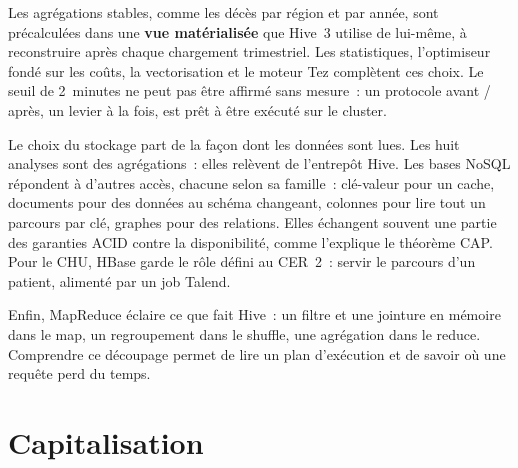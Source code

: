 \noindent Les agrégations stables, comme les décès par région et par année, sont précalculées dans une \textbf{vue matérialisée} que Hive~3 utilise de lui-même, à reconstruire après chaque chargement trimestriel. Les statistiques, l'optimiseur fondé sur les coûts, la vectorisation et le moteur Tez complètent ces choix. Le seuil de 2~minutes ne peut pas être affirmé sans mesure~: un protocole avant / après, un levier à la fois, est prêt à être exécuté sur le cluster.

\vspace{0.2cm}

\noindent Le choix du stockage part de la façon dont les données sont lues. Les huit analyses sont des agrégations~: elles relèvent de l'entrepôt Hive. Les bases NoSQL répondent à d'autres accès, chacune selon sa famille~: clé-valeur pour un cache, documents pour des données au schéma changeant, colonnes pour lire tout un parcours par clé, graphes pour des relations. Elles échangent souvent une partie des garanties ACID contre la disponibilité, comme l'explique le théorème CAP. Pour le CHU, HBase garde le rôle défini au CER~2~: servir le parcours d'un patient, alimenté par un job Talend.

\vspace{0.2cm}

\noindent Enfin, MapReduce éclaire ce que fait Hive~: un filtre et une jointure en mémoire dans le map, un regroupement dans le shuffle, une agrégation dans le reduce. Comprendre ce découpage permet de lire un plan d'exécution et de savoir où une requête perd du temps.

\newpage
\section*{Capitalisation}
{}

